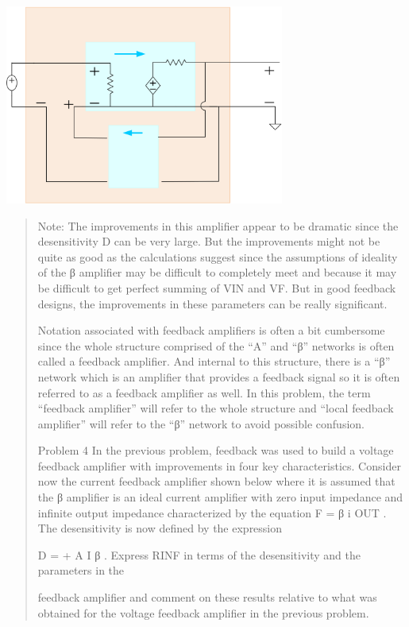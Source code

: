 \documentclass[10pt,a4paper]{article}
\begin{document}
\includegraphics[width=3.61111in,height=2.58333in]{vertopal_3376d9a0695b4078a59040ba2f51c60d/media/image1.png}


\begin{quote}
Note: The improvements in this amplifier appear to be dramatic since the
desensitivity D can be very large. But the improvements might not be
quite as good as the calculations suggest since the assumptions of
ideality of the β amplifier may be difficult to completely meet and
because it may be difficult to get perfect summing of VIN and VF. But in
good feedback designs, the improvements in these parameters can be
really significant.

Notation associated with feedback amplifiers is often a bit cumbersome
since the whole structure comprised of the ``A'' and ``β'' networks is
often called a feedback amplifier. And internal to this structure, there
is a ``β'' network which is an amplifier that provides a feedback signal
so it is often referred to as a feedback amplifier as well. In this
problem, the term ``feedback amplifier'' will refer to the whole
structure and ``local feedback amplifier'' will refer to the ``β''
network to avoid possible confusion.

Problem 4 In the previous problem, feedback was used to build a voltage
feedback amplifier with improvements in four key characteristics.
Consider now the current feedback amplifier shown below where it is
assumed that the β amplifier is an ideal current amplifier with zero
input impedance and infinite output impedance characterized by the
equation F = β i OUT . The desensitivity is now defined by the
expression

D = + A I β . Express RINF in terms of the desensitivity and the
parameters in the

feedback amplifier and comment on these results relative to what was
obtained for the voltage feedback amplifier in the previous problem.
\end{quote}
\end{document}
